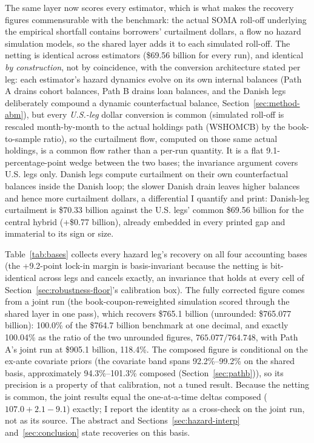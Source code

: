 \documentclass[12pt]{article}
\begin{document}
The same layer now scores every estimator, which is what makes the recovery figures commensurable with the benchmark: the actual SOMA roll-off underlying the empirical shortfall contains borrowers' curtailment dollars, a flow no hazard simulation models, so the shared layer adds it to each simulated roll-off. The netting is identical across estimators (\$69.56 billion for every run), and identical \emph{by construction}, not by coincidence, with the conversion architecture stated per leg: each estimator's hazard dynamics evolve on its own internal balances (Path A drains cohort balances, Path B drains loan balances, and the Danish legs deliberately compound a dynamic counterfactual balance, Section~\ref{sec:method-abm}), but every \emph{U.S.-leg} dollar conversion is common (simulated roll-off is rescaled month-by-month to the actual holdings path (WSHOMCB) by the book-to-sample ratio), so the curtailment flow, computed on those same actual holdings, is a common flow rather than a per-run quantity. It is a flat 9.1-percentage-point wedge between the two bases; the invariance argument covers U.S. legs only. Danish legs compute curtailment on their own counterfactual balances inside the Danish loop; the slower Danish drain leaves higher balances and hence more curtailment dollars, a differential I quantify and print: Danish-leg curtailment is \$70.33 billion against the U.S. legs' common \$69.56 billion for the central hybrid (+\$0.77 billion), already embedded in every printed gap and immaterial to its sign or size.

Table~\ref{tab:bases} collects every hazard leg's recovery on all four accounting bases (the +9.2-point lock-in margin is basis-invariant because the netting is bit-identical across legs and cancels exactly, an invariance that holds at every cell of Section~\ref{sec:robustness-floor}'s calibration box). The fully corrected figure comes from a joint run (the book-coupon-reweighted simulation scored through the shared layer in one pass), which recovers \$765.1 billion (unrounded: \$765.077 billion): 100.0\% of the \$764.7 billion benchmark at one decimal, and exactly 100.04\% as the ratio of the two unrounded figures, $765.077/764.748$, with Path A's joint run at \$905.1 billion, 118.4\%. The composed figure is conditional on the ex-ante covariate priors (the covariate band spans 92.2\%--99.2\% on the shared basis, approximately 94.3\%--101.3\% composed (Section~\ref{sec:pathb})), so its precision is a property of that calibration, not a tuned result. Because the netting is common, the joint results equal the one-at-a-time deltas composed ($107.0 + 2.1 - 9.1$) exactly; I report the identity as a cross-check on the joint run, not as its source. The abstract and Sections~\ref{sec:hazard-interp} and~\ref{sec:conclusion} state recoveries on this basis.
\end{document}
